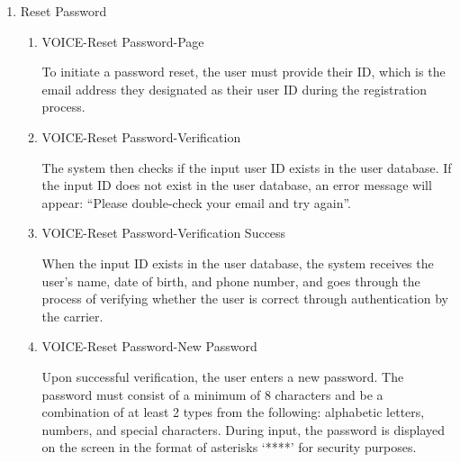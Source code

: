 \documentclass[conference]{IEEEtran}
\begin{document}
\begin{enumerate}[label=\arabic*]
    \vspace{1em}
    
    \item Reset Password\par
    \vspace{0.3em}

    \begin{enumerate}[label=\arabic*)]
        \item VOICE-Reset Password-Page\par
        \vspace{0.3em}
        To initiate a password reset, the user must provide their ID, which is the email address they designated as their user ID during the registration process. 

        \vspace{1em}

        \item VOICE-Reset Password-Verification\par
        \vspace{0.3em}
        The system then checks if the input user ID exists in the user database. If the input ID does not exist in the user database, an error message will appear: “Please double-check your email and try again”.

        \vspace{1em}

        \item VOICE-Reset Password-Verification Success\par
        \vspace{0.3em}
        When the input ID exists in the user database, the system receives the user’s name, date of birth, and phone number, and goes through the process of verifying whether the user is correct through authentication by the carrier.

        \vspace{1em}

        \item VOICE-Reset Password-New Password\par
        \vspace{0.3em}
        Upon successful verification, the user enters a new password. The password must consist of a minimum of 8 characters and be a combination of at least 2 types from the following: alphabetic letters, numbers, and special characters. During input, the password is displayed on the screen in the format of asterisks ‘****’ for security purposes.
    \end{enumerate}
\end{enumerate}
\end{document}
